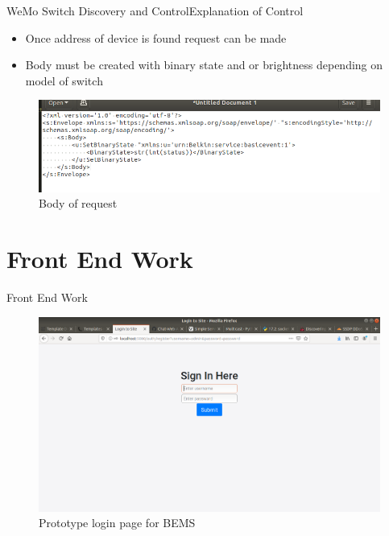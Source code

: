 \documentclass{beamer}
\begin{document}
\begin{frame}{WeMo Switch Discovery and Control}{Explanation of Control}
\begin{itemize}
\item Once address of device is found request can be made
\item Body must be created with binary state and or brightness depending on model of switch
\end{itemize}
\begin{figure}
\includegraphics[scale=0.3]{figs/img/soapRequestWeMO}
\caption{Body of request}
\end{figure}
\end{frame}

\section{Front End Work}
\begin{frame}{Front End Work}{}
\begin{figure}
\includegraphics[scale=0.25]{figs/img/signInPage}
\caption{Prototype login page for BEMS}
\end{figure}
\end{frame}
\end{document}
